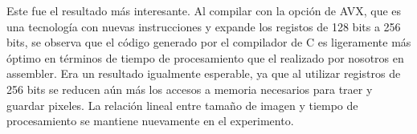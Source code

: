\documentclass[a4paper]{article}
\begin{document}
Este fue el resultado más interesante. Al compilar con la opción de AVX, que es una tecnología con nuevas instrucciones y expande los registos de 128 bits a 256 bits, se observa que el código generado por el compilador de C es ligeramente más óptimo en términos de tiempo de procesamiento que el realizado por nosotros en assembler. Era un resultado igualmente esperable, ya que al utilizar registros de 256 bits se reducen aún más los accesos a memoria necesarios para traer y guardar pixeles. La relación lineal entre tamaño de imagen y tiempo de procesamiento se mantiene nuevamente en el experimento.  
\newline
\end{document}

